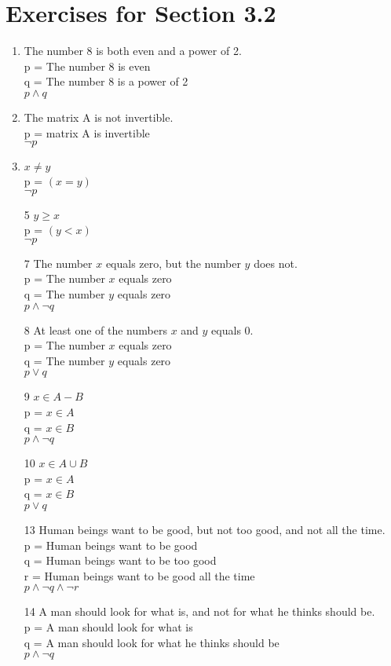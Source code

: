 \documentclass[12pt]{article}
\begin{document}
\section*{Exercises for Section 3.2}
\begin{enumerate}
	\item The number 8 is both even and a power of 2.\\
	    p = The number 8 is even\\
	    q = The number 8 is a power of 2\\
	    $p\land q$
	\item The matrix A is not invertible.\\
	    p = matrix A is invertible\\
	    $\neg p$
	\item $x\neq y$\\
	    p = $(x=y)$\\
	    $\neg p$
	\item[5] $y\ge x$\\
	    p = $(y<x)$\\
	    $\neg p$
	\item[7] The number $x$ equals zero, but the number $y$ does not.\\
	    p = The number $x$ equals zero\\
	    q = The number $y$ equals zero\\
	    $p \land \neg q$
	\item[8] At least one of the numbers $x$ and $y$ equals $0$.\\
	    p = The number $x$ equals zero\\
	    q = The number $y$ equals zero\\
	    $p \lor q$
	\item[9] $x\in A-B$\\
	    p = $x\in A$\\
	    q = $x\in B$\\
	    $p \land \neg q$
	\item[10] $x\in A\cup B$\\
	    p = $x\in A$\\
	    q = $x\in B$\\
	    $p \lor q$
	\item[13] Human beings want to be good, but not too good, and not all the time.\\
	    p = Human beings want to be good\\
	    q = Human beings want to be too good\\
	    r = Human beings want to be good all the time\\
	    $p \land \neg q \land \neg r$
	\item[14] A man should look for what is, and not for what he thinks should be.\\
	    p = A man should look for what is\\
	    q = A man should look for what he thinks should be\\
	    $p \land \neg q$
\end{enumerate}
\end{document}
